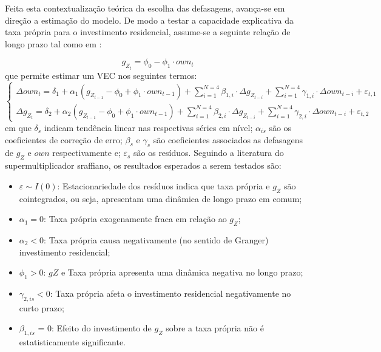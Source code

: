 Feita esta contextualização teórica da escolha das defasagens, avança-se em direção a estimação do modelo. De modo a testar a capacidade explicativa da taxa própria para o investimento residencial, assume-se a seguinte relação de longo prazo tal como em \textcite{teixeira_crescimento_2015}:

\begin{equation}
g_{Z_t} = \phi_0 - \phi_1\cdot own_t
\end{equation}
que permite estimar um VEC nos seguintes termos:
\begin{equation}
\begin{cases}
\Delta own_t = \delta_{1} + \alpha_1(g_{Z_{t-1}} - \phi_0 + \phi_1\cdot own_{t-1}) + \sum^{N=4}_{i=1}\beta_{1,i}\cdot \Delta g_{Z_{t-i}} +
\sum^{N=4}_{i=1}\gamma_{1,i}\cdot \Delta own_{t-i} +\varepsilon_{t,1}
\\
\Delta g_{Z_{t}} = \delta_{2} + \alpha_2(g_{Z_{t-1}} - \phi_0 + \phi_1\cdot own_{t-1}) + \sum^{N=4}_{i=1}\beta_{2,i}\cdot \Delta g_{Z_{t-i}} +
\sum^{N=4}_{i=1}\gamma_{2,i}\cdot \Delta own_{t-i} +\varepsilon_{t,2}
\end{cases}
\end{equation}
em que $\delta_s$ indicam tendência linear nas respectivas séries em nível;
$\alpha_{is}$ são os coeficientes de correção de erro; 
$\beta_s$ e $\gamma_s$ são coeficientes associados as defasagens de  $g_Z$ e $own$ respectivamente e; $\varepsilon_s$ são os resíduos.
Seguindo a literatura do supermultiplicador sraffiano, os resultados esperados a serem testados são:
\begin{itemize}
\item $\varepsilon \sim I(0)$: Estacionariedade dos resíduos indica que taxa própria e $g_Z$ são cointegrados, ou seja, apresentam uma dinâmica de longo prazo em comum;
\item $\alpha_1 = 0$: Taxa própria exogenamente fraca em relação ao $g_Z$;
\item $\alpha_2 < 0$: Taxa própria causa negativamente (no sentido de Granger) investimento residencial;
\item $\phi_1 > 0$: $gZ$ e Taxa própria apresenta uma dinâmica negativa no longo prazo;
\item $\gamma_{2,is} < 0$: Taxa própria afeta o investimento residencial negativamente no curto prazo;
\item $\beta_{1,is}$ = 0: Efeito do investimento de $g_Z$ sobre a taxa própria não é estatisticamente significante.
\end{itemize}





